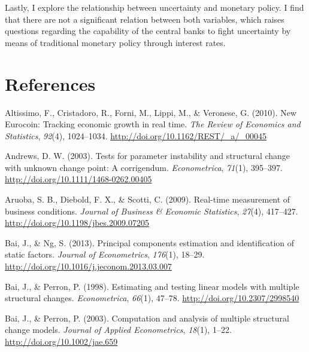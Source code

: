 \documentclass[12pt,twoside]{reedthesis}
\begin{document}
Lastly, I explore the relationship between uncertainty and monetary policy. I find that there are not a significant relation between both variables, which raises questions regarding the capability of the central banks to fight uncertainty by means of traditional monetary policy through interest rates.

\backmatter

\hypertarget{references}{%
\chapter*{References}\label{references}}


\noindent

\setlength{\parindent}{-0.20in}
\setlength{\leftskip}{0.20in}
\setlength{\parskip}{8pt}

\hypertarget{refs}{}
\leavevmode\hypertarget{ref-altietal:2010}{}%
Altissimo, F., Cristadoro, R., Forni, M., Lippi, M., \& Veronese, G. (2010). New Eurocoin: Tracking economic growth in real time. \emph{The Review of Economics and Statistics}, \emph{92}(4), 1024--1034. \url{http://doi.org/10.1162/REST/_a/_00045}

\leavevmode\hypertarget{ref-andrews:2003}{}%
Andrews, D. W. (2003). Tests for parameter instability and structural change with unknown change point: A corrigendum. \emph{Econometrica}, \emph{71}(1), 395--397. \url{http://doi.org/10.1111/1468-0262.00405}

\leavevmode\hypertarget{ref-aruoetal:2009}{}%
Aruoba, S. B., Diebold, F. X., \& Scotti, C. (2009). Real-time measurement of business conditions. \emph{Journal of Business \& Economic Statistics}, \emph{27}(4), 417--427. \url{http://doi.org/10.1198/jbes.2009.07205}

\leavevmode\hypertarget{ref-baing:2013}{}%
Bai, J., \& Ng, S. (2013). Principal components estimation and identification of static factors. \emph{Journal of Econometrics}, \emph{176}(1), 18--29. \url{http://doi.org/10.1016/j.jeconom.2013.03.007}

\leavevmode\hypertarget{ref-baiperr:1998}{}%
Bai, J., \& Perron, P. (1998). Estimating and testing linear models with multiple structural changes. \emph{Econometrica}, \emph{66}(1), 47--78. \url{http://doi.org/10.2307/2998540}

\leavevmode\hypertarget{ref-baiperr:2003}{}%
Bai, J., \& Perron, P. (2003). Computation and analysis of multiple structural change models. \emph{Journal of Applied Econometrics}, \emph{18}(1), 1--22. \url{http://doi.org/10.1002/jae.659}
\end{document}
